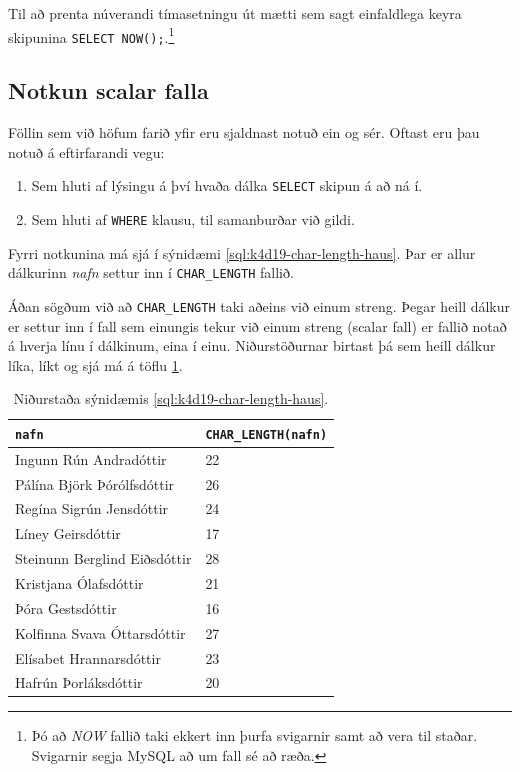 Til að prenta núverandi tímasetningu út mætti sem sagt einfaldlega keyra skipunina \verb|SELECT NOW();|.\footnote{Þó að \emph{NOW} fallið taki ekkert inn þurfa svigarnir samt að vera til staðar. Svigarnir segja MySQL að um fall sé að ræða.}
\subsection{Notkun scalar falla}
Föllin sem við höfum farið yfir eru sjaldnast notuð ein og sér. Oftast eru þau notuð á eftirfarandi vegu:
\begin{enumerate}
 \item Sem hluti af lýsingu á því hvaða dálka \verb|SELECT| skipun á að ná í.
 \item Sem hluti af \verb|WHERE| klausu, til samanburðar við gildi.
\end{enumerate}

Fyrri notkunina má sjá í sýnidæmi \ref{sql:k4d19-char-length-haus}. Þar er allur dálkurinn \emph{nafn} settur inn í \verb|CHAR_LENGTH| fallið.

Áðan sögðum við að \verb|CHAR_LENGTH| taki aðeins við einum streng. Þegar heill dálkur er settur inn í fall sem einungis tekur við einum streng (scalar fall) er fallið notað á hverja línu í dálkinum, eina í einu. Niðurstöðurnar birtast þá sem heill dálkur líka, líkt og sjá má á töflu \ref{tafla:lengd-nafna}.

\begin{example}
\caption[CHAR\_LENGTH í dálklýsingu]{\emph{SELECT} skipun sem finnur lengd nafna allra nemenda í nemendatöflunni sem enda á \emph{``dóttir''}. Niðurstöðu má sjá á töflu \ref{tafla:lengd-nafna}.}
\label{sql:k4d19-char-length-haus}
\centering
{}
\end{example}

\begin{table}
\centering
\caption[Lengd nafna]{Niðurstaða sýnidæmis \ref{sql:k4d19-char-length-haus}.}
\label{tafla:lengd-nafna}
\begin{tabular}{ll}
\toprule
\verb|nafn|&\verb|CHAR_LENGTH(nafn)|\\
\midrule
Ingunn Rún Andradóttir&22\\
Pálína Björk Þórólfsdóttir&26\\
Regína Sigrún Jensdóttir&24\\
Líney Geirsdóttir&17\\
Steinunn Berglind Eiðsdóttir&28\\
Kristjana Ólafsdóttir&21\\
Þóra Gestsdóttir&16\\
Kolfinna Svava Óttarsdóttir&27\\
Elísabet Hrannarsdóttir&23\\
Hafrún Þorláksdóttir&20\\
\bottomrule
\end{tabular}
\end{table}

